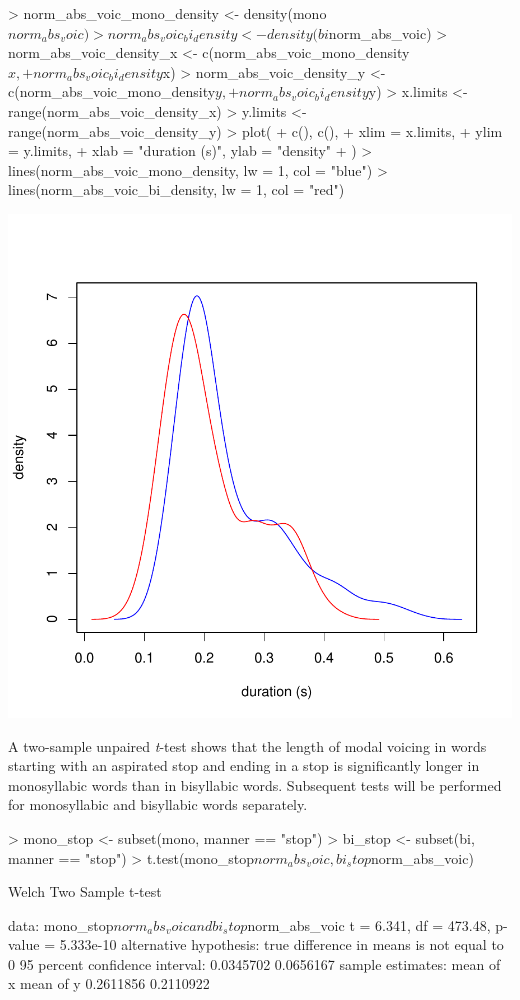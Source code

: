 \documentclass[a4paper,11pt]{article}
\begin{document}
\begin{Schunk}
\begin{Sinput}
> norm_abs_voic_mono_density <- density(mono$norm_abs_voic)
> norm_abs_voic_bi_density <- density(bi$norm_abs_voic)
> norm_abs_voic_density_x <- c(norm_abs_voic_mono_density$x, 
+                                   norm_abs_voic_bi_density$x)
> norm_abs_voic_density_y <- c(norm_abs_voic_mono_density$y, 
+                                   norm_abs_voic_bi_density$y)
> x.limits <- range(norm_abs_voic_density_x)
> y.limits <- range(norm_abs_voic_density_y)
> plot(
+ c(), c(),
+ xlim = x.limits,
+ ylim = y.limits,
+ xlab = "duration (s)", ylab = "density"
+ )
> lines(norm_abs_voic_mono_density, lw = 1, col = "blue")
> lines(norm_abs_voic_bi_density, lw = 1, col = "red")
\end{Sinput}
\end{Schunk}
\includegraphics{analysis-005}

A two-sample unpaired \textit{t}-test shows that the length of modal voicing in words starting with an aspirated stop and ending in a stop is significantly longer in monosyllabic words than in bisyllabic words.
Subsequent tests will be performed for monosyllabic and bisyllabic words separately.

\begin{Schunk}
\begin{Sinput}
> mono_stop <- subset(mono, manner == "stop")
> bi_stop <- subset(bi, manner == "stop")
> t.test(mono_stop$norm_abs_voic, bi_stop$norm_abs_voic)
\end{Sinput}
\begin{Soutput}
	Welch Two Sample t-test

data:  mono_stop$norm_abs_voic and bi_stop$norm_abs_voic
t = 6.341, df = 473.48, p-value = 5.333e-10
alternative hypothesis: true difference in means is not equal to 0
95 percent confidence interval:
 0.0345702 0.0656167
sample estimates:
mean of x mean of y 
0.2611856 0.2110922 
\end{Soutput}
\end{Schunk}
\end{document}
